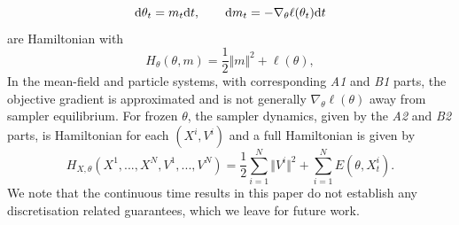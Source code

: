 \begin{equation*}
    \mathrm{d}\theta_t=m_t \mathrm{d} t,\qquad
    \mathrm{d} m_t=-\nabla_\theta\ell(\theta_t)\mathrm{d} t
\end{equation*}
are Hamiltonian with
\begin{equation*}
    H_\theta(\theta,m)=\frac{1}{2}\Vert m\Vert^2+\ell(\theta),
\end{equation*}
In the mean-field and particle systems, with corresponding \textit{A1} and \textit{B1} parts, the objective gradient is approximated and is not generally $\nabla_\theta\ell(\theta)$ away from sampler equilibrium. For frozen $\theta$, the sampler dynamics, given by the \textit{A2} and \textit{B2} parts, is Hamiltonian for each $(X^i,V^i)$ and a full Hamiltonian is given by
\begin{equation*}
    H_{X,\theta}(X^1,...,X^N,V^1,...,V^N)=\frac{1}{2}\sum_{i=1}^N\Vert V^i\Vert^2+\sum_{i=1}^N E(\theta,X^i_t).
\end{equation*}
We note that the continuous time results in this paper do not establish any discretisation related guarantees, which we leave for future work. 

